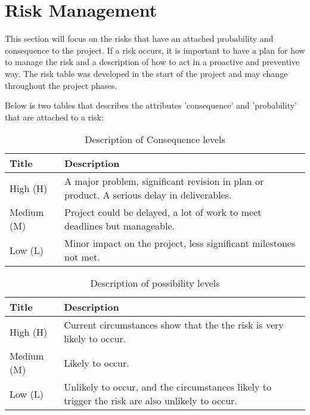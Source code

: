 
\pagestyle{fancy}
\clearpage
\section{Risk Management}

This section will focus on the risks that have an attached probability and consequence to the project. If a risk occurs, it is important to have a plan for how to manage the risk and a description of how to act in a proactive and preventive way. The risk table was developed in the start of the project and may change throughout the project phases.

Below is two tables that describes the attributes 'consequence' and 'probability' that are attached to a risk:


\begin{table}[H]
\begin{tabular}{| p{3cm} | p{8cm} |}
  \hline
  \rowcolor{gray}
  {\bf Title} & {\bf Description} \\ \hline
    High (H) & A major problem, significant revision in plan or product. 
    A serious delay in deliverables.\\ \hline
    Medium (M) & Project could be delayed, a lot of work to meet deadlines but
    manageable.\\ \hline
    Low (L) & Minor impact on the project, less significant milestones not met.\\ \hline
\end{tabular}
\caption{Description of Consequence levels}
\end{table}

\begin{table}[H]
\begin{tabular}{| p{3cm} | p{8cm} |}
  \hline
  \rowcolor{gray}
    {\bf Title} & {\bf Description} \\ \hline
    High (H) & Current circumstances show that the the risk is very 
    likely to occur.\\ \hline
    Medium (M) & Likely to occur.\\ \hline
    Low (L) & Unlikely to occur, and the circumstances likely to trigger 
    the risk are also unlikely to occur.\\ \hline
\end{tabular}
\caption{Description of possibility levels}
\end{table}

